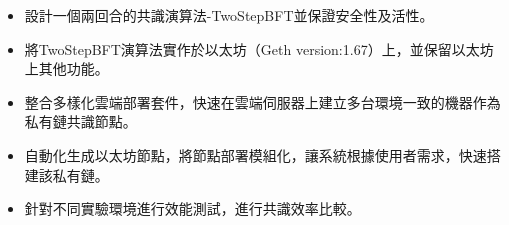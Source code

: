 \begin{itemize}%
\item 設計一個兩回合的共識演算法-TwoStepBFT並保證安全性及活性。
\item 將TwoStepBFT演算法實作於以太坊（Geth version:1.67）上，並保留以太坊上其他功能。
\item 整合多樣化雲端部署套件，快速在雲端伺服器上建立多台環境一致的機器作為私有鏈共識節點。
\item 自動化生成以太坊節點，將節點部署模組化，讓系統根據使用者需求，快速搭建該私有鏈。
\item 針對不同實驗環境進行效能測試，進行共識效率比較。 
\end{itemize}





